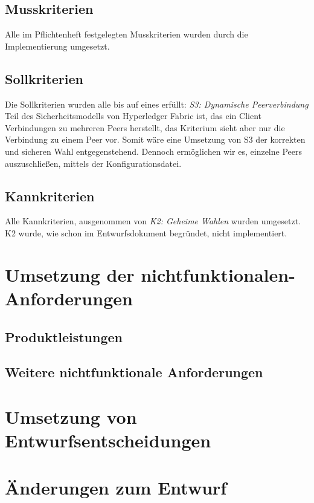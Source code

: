 \documentclass[parskip=full]{scrartcl}
\begin{document}
\subsection{Musskriterien}
Alle im Pflichtenheft festgelegten Musskriterien wurden durch die Implementierung umgesetzt.

\subsection{Sollkriterien}
Die Sollkriterien wurden alle bis auf eines erfüllt:
\textit{S3: Dynamische Peerverbindung}\\
Teil des Sicherheitsmodells von Hyperledger Fabric ist, das ein Client Verbindungen zu mehreren Peers herstellt, das Kriterium sieht aber nur die Verbindung zu einem Peer vor.
Somit wäre eine Umsetzung von S3 der korrekten und sicheren Wahl entgegenstehend. Dennoch ermöglichen wir es, einzelne Peers auszuschließen, mittels der Konfigurationsdatei. 

\subsection{Kannkriterien}
Alle Kannkriterien, ausgenommen von \textit{K2: Geheime Wahlen} wurden umgesetzt. K2 wurde, wie schon im Entwurfsdokument begründet, nicht implementiert.

\section{Umsetzung der nichtfunktionalen-Anforderungen}

\subsection{Produktleistungen}
	
\subsection{Weitere nichtfunktionale Anforderungen}

		
\section{Umsetzung von Entwurfsentscheidungen}


\section{Änderungen zum Entwurf}
\end{document}
